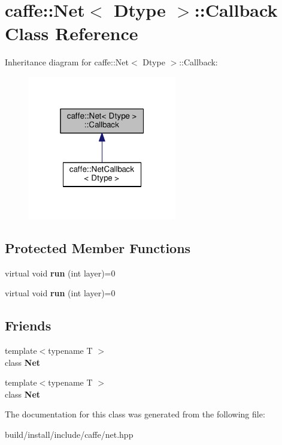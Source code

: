 \hypertarget{classcaffe_1_1_net_1_1_callback}{}\section{caffe\+:\+:Net$<$ Dtype $>$\+:\+:Callback Class Reference}
\label{classcaffe_1_1_net_1_1_callback}


Inheritance diagram for caffe\+:\+:Net$<$ Dtype $>$\+:\+:Callback\+:
\nopagebreak
\begin{figure}[H]
\begin{center}
\leavevmode
\includegraphics[width=184pt]{classcaffe_1_1_net_1_1_callback__inherit__graph}
\end{center}
\end{figure}
\subsection*{Protected Member Functions}
\begin{DoxyCompactItemize}
\item 
\mbox{\label{classcaffe_1_1_net_1_1_callback_af2a143020f1b44b6da7c95333a364305}} 
virtual void {\bfseries run} (int layer)=0
\item 
\mbox{\label{classcaffe_1_1_net_1_1_callback_af2a143020f1b44b6da7c95333a364305}} 
virtual void {\bfseries run} (int layer)=0
\end{DoxyCompactItemize}
\subsection*{Friends}
\begin{DoxyCompactItemize}
\item 
\mbox{\label{classcaffe_1_1_net_1_1_callback_a594f84a944ccdd63ca62bfd4f8623836}} 
{\footnotesize template$<$typename T $>$ }\\class {\bfseries Net}
\item 
\mbox{\label{classcaffe_1_1_net_1_1_callback_add72b71fcf07b21c71a0e6852f894019}} 
{\footnotesize template$<$typename T $>$ }\\class {\bfseries Net}
\end{DoxyCompactItemize}


The documentation for this class was generated from the following file\+:\begin{DoxyCompactItemize}
\item 
build/install/include/caffe/net.\+hpp\end{DoxyCompactItemize}
